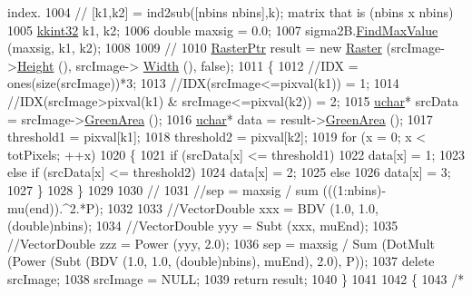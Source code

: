 \begin{DoxyCode}
{{{{{{{{{{{{{{{{{{{{{{{{{{{{{{{{{{{{{{{{{{{{{{{{{{{{{{       index.}
1004     \textcolor{comment}{// [k1,k2] = ind2sub([nbins nbins],k);  %
       matrix that is (nbins x nbins)}
1005     \hyperlink{namespace_k_k_b_a8fa4952cc84fda1de4bec1fbdd8d5b1b}{kkint32}  k1, k2;
1006     \textcolor{keywordtype}{double}  maxsig = 0.0;
1007     sigma2B.\hyperlink{class_k_k_b_1_1_matrix_ac4861e80e5f5f5a03bc61fd756538af5}{FindMaxValue} (maxsig, k1, k2);
1008    
1009     \textcolor{comment}{//%
1010     \hyperlink{class_k_k_b_1_1_raster}{RasterPtr}  result = \textcolor{keyword}{new} \hyperlink{class_k_k_b_1_1_raster}{Raster} (srcImage->\hyperlink{class_k_k_b_1_1_raster_af8d10d15697d5b92fb9595c48b529feb}{Height} (), srcImage->
      \hyperlink{class_k_k_b_1_1_raster_aa2780c0b7ae75b7b595f99329689c1f6}{Width} (), \textcolor{keyword}{false});
1011     \{
1012       \textcolor{comment}{//IDX = ones(size(srcImage))*3;}
1013       \textcolor{comment}{//IDX(srcImage<=pixval(k1)) = 1;}
1014       \textcolor{comment}{//IDX(srcImage>pixval(k1) & srcImage<=pixval(k2)) = 2;}
1015       \hyperlink{namespace_k_k_b_ace9969169bf514f9ee6185186949cdf7}{uchar}*  srcData = srcImage->\hyperlink{class_k_k_b_1_1_raster_af6ceacfa7835a295d239d141627dbec7}{GreenArea} ();
1016       \hyperlink{namespace_k_k_b_ace9969169bf514f9ee6185186949cdf7}{uchar}*  data = result->\hyperlink{class_k_k_b_1_1_raster_af6ceacfa7835a295d239d141627dbec7}{GreenArea} ();
1017       threshold1 = pixval[k1];
1018       threshold2 = pixval[k2];
1019       \textcolor{keywordflow}{for}  (x = 0;  x < totPixels;  ++x)
1020       \{
1021         \textcolor{keywordflow}{if}  (srcData[x] <= threshold1)
1022           data[x] = 1;
1023         \textcolor{keywordflow}{else} \textcolor{keywordflow}{if}  (srcData[x] <= threshold2)
1024           data[x] = 2;
1025         \textcolor{keywordflow}{else}
1026           data[x] = 3;
1027       \}
1028     \}
1029     
1030     \textcolor{comment}{//%
1031     \textcolor{comment}{//sep = maxsig / sum (((1:nbins)-mu(end)).^2.*P);}
1032 
1033     \textcolor{comment}{//VectorDouble  xxx = BDV (1.0, 1.0, (double)nbins);}
1034     \textcolor{comment}{//VectorDouble  yyy = Subt (xxx, muEnd);}
1035     \textcolor{comment}{//VectorDouble  zzz = Power (yyy, 2.0);}
1036     sep = maxsig / Sum (DotMult (Power (Subt (BDV (1.0, 1.0, (\textcolor{keywordtype}{double})nbins), muEnd), 2.0), P));
1037     \textcolor{keyword}{delete}  srcImage;
1038     srcImage = NULL;
1039     \textcolor{keywordflow}{return}  result;
1040   \}
1041     
1042   \{
1043     \textcolor{comment}{/*}
}}}}}}}}}}}}}}}}}}}}}}}}}}}}}}}}}}}}}}}}}}}}}}}}}}}}}}}
\end{DoxyCode}
